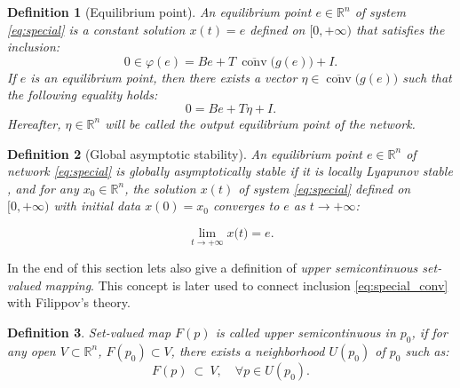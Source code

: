 \documentclass[journal]{IEEEtran}
\newtheorem{definition}{Definition}
\begin{document}
\begin{definition}[Equilibrium point]\label{equilib}
An \textit{equilibrium point} $e\in \mathbb{R}^n$ of system \eqref{eq:special} is a constant solution $x(t)=e$ defined on $[0,+\infty)$ that satisfies the inclusion:
\[      
    0\in\varphi(e) = 
    Be+T~\overline{\operatorname{conv}}\big(g(e)\big)+I.
\]
If $e$ is an \textit{equilibrium point}, then there exists a vector $\eta \in \overline{\operatorname{conv}}\big(g(e)\big)$ such that the following equality holds:
\[ 0=Be+T\eta+I \tag{a.e.}.\]
Hereafter, $\eta \in \mathbb{R}^n$ will be called the \textit{output equilibrium point} of the network.
\end{definition}

\begin{definition}[Global asymptotic stability]\label{gas_of_eq}
An equilibrium point $e \in \mathbb{R}^n$ of network \eqref{eq:special} is \textit{globally asymptotically stable} if it is locally Lyapunov stable \cite{Lyapunov}, and for any $ x_0\in \mathbb{R}^n$, the solution $x(t)$ of system \eqref{eq:special} defined on $[0,+\infty)$ with initial data $x(0)=x_0$ converges to $e$ as $t \to +\infty$:

   \[  \lim\limits_{t\to + \infty }x\big(t\big) = e.\]
\end{definition}

In the end of this section lets also give a definition of \textit{upper semicontinuous set-valued mapping}. This concept is later used to connect inclusion \eqref{eq:special_conv} with Filippov's theory. 

\begin{definition}
    Set-valued map $F(p)$ is called \textit{upper semicontinuous} in $p_0$, if for any open $V\subset\mathbb{R}^n$, $F(p_0)\subset V$, there exists a neighborhood $U(p_0)$ of $p_0$ such as:
\[ 
F(p) ~\subset ~ V, \quad \forall p\in U(p_0).
\]
\end{definition}

\end{document}
